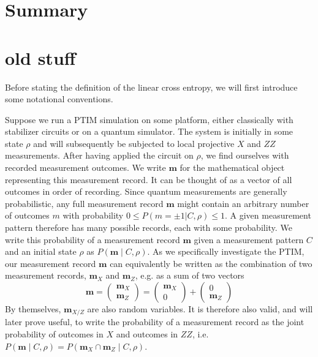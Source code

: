\section{Summary}

\section{old stuff}
Before stating the definition of the linear cross entropy, we will first
introduce some notational conventions.

Suppose we run a PTIM simulation on some platform, either classically with
stabilizer circuits or on a quantum simulator. The system is initially in some
state $\rho$ and will subsequently be subjected to local projective $X$ and
$ZZ$ measurements.  After having applied the circuit on $\rho$, we find
ourselves with recorded measurement outcomes. We write $\mathbf{m}$ for the
mathematical object representing this measurement record. It can be
thought of as a vector of all outcomes in order of recording.
Since quantum measurements are generally probabilistic, any full
measurement record $\mathbf{m}$ might contain an arbitrary number of outcomes
$m$ with probability $0\leq P(m=\pm 1 | C, \rho)\leq 1$. A given
measurement pattern therefore has many possible records, each with some
probability.  We write this probability of a measurement record $\mathbf{m}$
given a measurement pattern $C$ and an initial state $\rho$ as $P(\mathbf{m}
\mid C, \rho)$. As we specifically investigate the PTIM, our measurement record
$\mathbf{m}$ can equivalently be written as the combination of two measurement
records, $\mathbf{m}_X$ and $\mathbf{m}_{Z}$, e.g. as a sum of two vectors
\[
  \mathbf{m} = \begin{pmatrix} \mathbf{m}_X \\ \mathbf{m}_Z \end{pmatrix} 
  = \begin{pmatrix} \mathbf{m}_X \\ 0 \end{pmatrix} + \begin{pmatrix}
0 \\ \mathbf{m}_Z \end{pmatrix} 
\]
By themselves, $\mathbf{m}_{X/Z}$ are also random variables.
It is therefore also valid, and will later prove useful, to
write the probability of a measurement record as the joint probability of
outcomes in $X$ and outcomes in $ZZ$, i.e.  $P\left(\mathbf{m} \mid C,
\rho\right) = P\left(\mathbf{m}_X\cap \mathbf{m}_Z\mid C,\rho\right)$.

